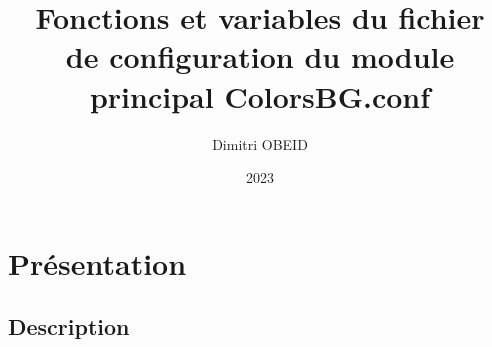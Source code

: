 \documentclass[a4paper,10pt]{article}
\title{\color{sec1}Fonctions et variables du fichier \\de configuration du module \\principal \color{path}ColorsBG.conf}\color{text}
\author{Dimitri OBEID}
\date{2023}
\begin{document}
\maketitle
\newpage

\hypertarget{contents}{}
\tableofcontents
\newpage

\color{sec1}
\section{Présentation}\color{text}

\color{sec2}
\subsection{Description}\color{text}
\end{document}
